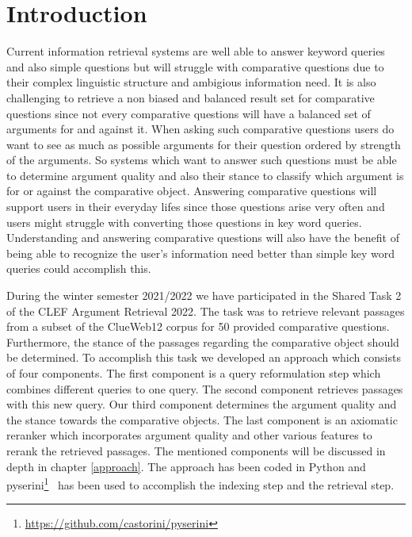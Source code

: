 \section{Introduction} \label{intro}
    Current information retrieval systems are well able to answer keyword queries and also simple questions but will struggle with comparative questions due to their complex linguistic structure and ambigious information need.  It is also challenging to retrieve  a non biased and balanced result set for comparative questions since not every comparative questions will have a balanced set of arguments for and against it. When asking such comparative questions users do want to see as much as possible arguments for their question  ordered by strength of the arguments. So systems which want to answer such questions must be able to determine argument quality and also their stance to classify which argument is for or against the comparative object.
    Answering comparative questions will support users in their everyday lifes since those questions arise very often and users might struggle with converting those questions in key word queries. Understanding and answering comparative questions will also have the benefit of being able to recognize the user's information need better than simple key word queries could accomplish this. 
    \par
    During the winter semester 2021/2022 we have participated in the Shared Task 2 of the CLEF Argument Retrieval 2022. The task was to retrieve relevant passages from a subset of the ClueWeb12 corpus for 50 provided comparative questions. Furthermore, the stance of the passages regarding the comparative object should be determined. To accomplish this task we developed an approach which consists of four components. The first component is a query reformulation step which combines different queries to one query. The second component retrieves passages with this new query. Our third component determines the argument quality and the stance towards the comparative objects. The last component is an axiomatic reranker which incorporates argument quality and other various features to rerank the retrieved passages. The mentioned components will be discussed in depth in chapter \ref{approach}. The approach has been coded in Python and pyserini\footnote{\url{https://github.com/castorini/pyserini}}~\cite{LinMLYPN2021} has been used to accomplish the indexing step and the retrieval step.   